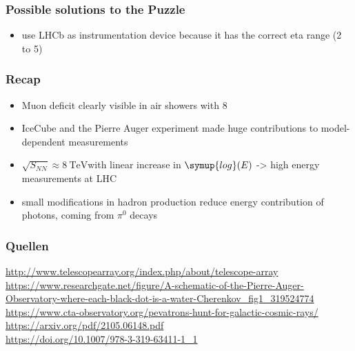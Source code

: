 \documentclass[aspectratio=1610, 9pt]{beamer}
\begin{document}
\begin{frame}\frametitle{Possible solutions to the Puzzle}
  \begin{itemize}
    \item use LHCb as instrumentation device because it has the correct eta range (2 to 5)
  \end{itemize}
\end{frame}

\begin{frame}\frametitle{Recap}
  \begin{itemize}
    \item Muon deficit clearly visible in air showers with 8\sigma
    \item IceCube and the Pierre Auger experiment made huge contributions to model-dependent measurements
    \item $\sqrt{S_{NN}} \approx \SI{8}{\tera\electronvolt}$with linear increase in $\symup{log}(E)$ -> high energy measurements at LHC
    \item small modifications in hadron production reduce energy contribution of photons, coming from $\pi^{0}$ decays
  \end{itemize}
\end{frame}

\begin{frame}\frametitle{Quellen}
\url{http://www.telescopearray.org/index.php/about/telescope-array} \\
\url{https://www.researchgate.net/figure/A-schematic-of-the-Pierre-Auger-Observatory-where-each-black-dot-is-a-water-Cherenkov_fig1_319524774} \\
\url{https://www.cta-observatory.org/pevatrons-hunt-for-galactic-cosmic-rays/} \\
\url{https://arxiv.org/pdf/2105.06148.pdf} \\
\url{https://doi.org/10.1007/978-3-319-63411-1_1} \\
\end{frame}
\end{document}

